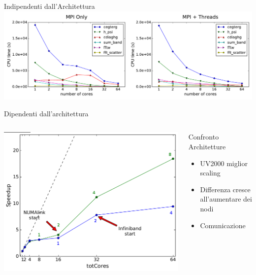\documentclass[8pt]{beamer}
\begin{document}
\begin{frame}{Indipendenti dall'Architettura}
	\includegraphics[width=1\textwidth]{threads_comparison.pdf}	
\end{frame}



\begin{frame}{Dipendenti dall'architettura}
\begin{columns}
			\includegraphics[width=1\textwidth]{beam_arch_global.jpg}			
		\begin{block}{Confronto Architetture}
			\begin{itemize}
				\item UV2000 miglior scaling
				\item Differenza cresce all'aumentare dei nodi
				\item Comunicazione	
			\end{itemize}
		\end{block}
\end{columns}
\end{frame}
\end{document}
